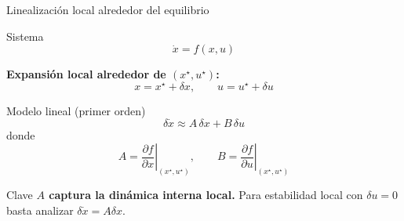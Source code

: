\documentclass[aspectratio=169,10pt]{beamer}
\newcommand{\importantbox}[2][Importante]{%
\begin{alertblock}{#1}#2\end{alertblock}}
\begin{document}
\begin{frame}{Linealización local alrededor del equilibrio}
\small

\begin{block}{Sistema}
\[
\dot{x}=f(x,u)
\]
\end{block}

\textbf{Expansión local alrededor de $(x^\star,u^\star)$:}
\[
x = x^\star + \delta x,\qquad u=u^\star+\delta u
\]

\begin{block}{Modelo lineal (primer orden)}
\[
\delta \dot{x} \approx A\,\delta x + B\,\delta u
\]
donde
\[
A=\left.\frac{\partial f}{\partial x}\right|_{(x^\star,u^\star)},\qquad
B=\left.\frac{\partial f}{\partial u}\right|_{(x^\star,u^\star)}
\]
\end{block}

\importantbox[Clave]{
\textbf{$A$ captura la dinámica interna local.} Para estabilidad local con $\delta u=0$ basta analizar $\delta \dot{x}=A\delta x$.
}

\end{frame}
\end{document}
